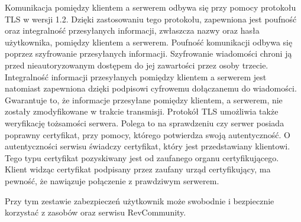 Komunikacja pomiędzy klientem a serwerem odbywa się przy pomocy protokołu TLS w wersji 1.2. Dzięki zastosowaniu tego protokołu, zapewniona jest poufność oraz integralność przesyłanych informacji, zwłaszcza nazwy oraz hasła użytkownika, pomiędzy klientem a serwerem. Poufność komunikacji odbywa się poprzez szyfrowanie przesyłanych informacji. Szyfrowanie wiadomości chroni ją przed nieautoryzowanym dostępem do jej zawartości przez osoby trzecie.
Integralność informacji przesyłanych pomiędzy klientem a serwerem jest natomiast zapewniona dzięki podpisowi cyfrowemu dołączanemu do wiadomości. Gwarantuje to, że informacje przesyłane pomiędzy klientem, a serwerem, nie zostały zmodyfikowane w trakcie transmisji.
 Protokół TLS umożliwia także weryfikację tożsamości serwera. Polega to na sprawdzeniu czy serwer posiada poprawny certyfikat, przy pomocy, którego potwierdza swoją autentyczność. O autentyczności serwisu świadczy certyfikat, który jest przedstawiany klientowi. Tego typu certyfikat pozyskiwany jest od zaufanego organu certyfikującego. Klient widząc certyfikat podpisany przez zaufany urząd certyfikujący, ma pewność, że nawiązuje połączenie z prawdziwym serwerem.
 
Przy tym zestawie zabezpieczeń użytkownik może swobodnie i bezpiecznie korzystać z zasobów oraz serwisu RevCommunity.
